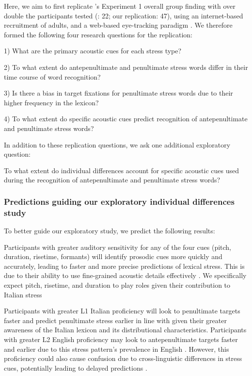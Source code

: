 Here, we aim to first replicate \cite{Sulpizio_McQueen_2012}'s Experiment 1 overall group finding with over double the participants tested (\cite{Sulpizio_McQueen_2012}: 22; our replication: 47), using an internet-based recruitment of adults, and a web-based eye-tracking paradigm \citep{Vos_2017}. We therefore formed the following four research questions for the replication:

1) What are the primary acoustic cues for each stress type? 

2) To what extent do antepenultimate and penultimate stress words differ in their time course of word recognition? 

3) Is there a bias in target fixations for penultimate stress words due to their higher frequency in the lexicon? 

4) To what extent do specific acoustic cues predict recognition of antepenultimate and penultimate stress words? 

In addition to these replication questions, we ask one additional exploratory question: 

To what extent do individual differences account for specific acoustic cues used during the recognition of antepenultimate and penultimate stress words?

\subsubsection{Predictions guiding our exploratory individual differences study}
To better guide our exploratory study, we predict the following results: 

Participants with greater auditory sensitivity for any of the four cues (pitch, duration, risetime, formants) will identify prosodic cues more quickly and accurately, leading to faster and more precise predictions of lexical stress. This is due to their ability to use fine-grained acoustic details effectively \citep{nan_2010, goss_2014,mcmurray_2008}. We specifically expect pitch, risetime, and duration to play roles given their contribution to Italian stress \citep{Tagliapietra2005, Alfano2006,Alfano2009,Maturi1998}

Participants with greater L1 Italian proficiency will look to penultimate targets faster and predict penultimate stress earlier in line with \cite{Sulpizio_McQueen_2012} given their greater awareness of the Italian lexicon and its distributional characteristics. Participants with greater L2 English proficiency may look to antepenultimate targets faster and earlier due to this stress pattern's prevalence in English \citep{cutler2007dutch}. However, this proficiency could also cause confusion due to cross-linguistic differences in stress cues, potentially leading to delayed predictions \citep{primativo2013bilingual}. 

